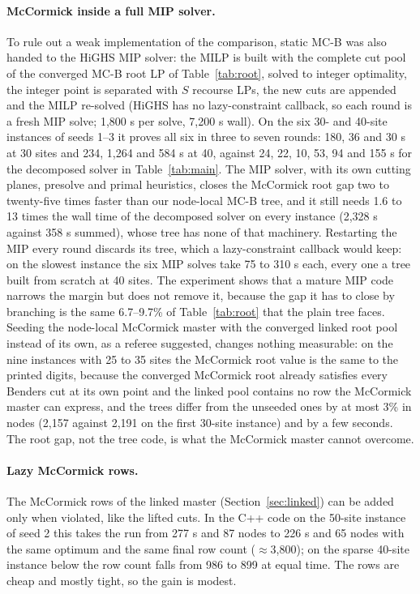 \documentclass[11pt]{article}
\begin{document}
\paragraph{McCormick inside a full MIP solver.} To rule out a weak implementation of the comparison, static
\textsc{MC-B} was also handed to the HiGHS MIP solver: the MILP is built with the complete cut pool of the converged
\textsc{MC-B} root LP of Table~\ref{tab:root}, solved to integer optimality, the integer point is separated with
$S$ recourse LPs, the new cuts are appended and the MILP re-solved (HiGHS has no lazy-constraint callback, so each
round is a fresh MIP solve; 1,800 s per solve, 7,200 s wall). On the six 30- and 40-site instances of seeds 1--3 it
proves all six in three to seven rounds: 180, 36 and 30 s at 30 sites and 234, 1,264 and 584 s at 40, against 24, 22,
10, 53, 94 and 155 s for the decomposed solver in Table~\ref{tab:main}. The MIP solver, with its own cutting planes,
presolve and primal heuristics, closes the McCormick root gap two to twenty-five times faster than our node-local
\textsc{MC-B} tree, and it still needs 1.6 to 13 times the wall time of the decomposed solver on every instance
(2,328 s against 358 s summed), whose tree has none of that machinery. Restarting the MIP every round discards its
tree, which a lazy-constraint callback would keep: on the slowest instance the six MIP solves take 75 to 310 s each,
every one a tree built from scratch at 40 sites. The experiment shows that a mature
MIP code narrows the margin but does not remove it, because the gap it has to close by branching is the same 6.7--9.7\%
of Table~\ref{tab:root} that the plain tree faces.
Seeding the node-local McCormick master with the converged linked root pool instead of its own, as a referee
suggested, changes nothing measurable: on the nine instances with 25 to 35 sites the McCormick root value is the same
to the printed digits, because the converged McCormick root already satisfies every Benders cut at its own point and
the linked pool contains no row the McCormick master can express, and the trees differ from the unseeded ones by at
most 3\% in nodes (2,157 against 2,191 on the first 30-site instance) and by a few seconds.
The root gap, not the tree code, is what the McCormick master cannot overcome.

\paragraph{Lazy McCormick rows.} The McCormick rows of the linked master (Section~\ref{sec:linked}) can be added only
when violated, like the lifted cuts. In the C++ code on the 50-site instance of seed 2 this takes the run from 277 s
and 87 nodes to 226 s and 65 nodes with the same optimum and the same final row count ($\approx$3,800); on the sparse
40-site instance below the row count falls from 986 to 899 at equal time. The rows are cheap and mostly tight, so the
gain is modest.
\end{document}
